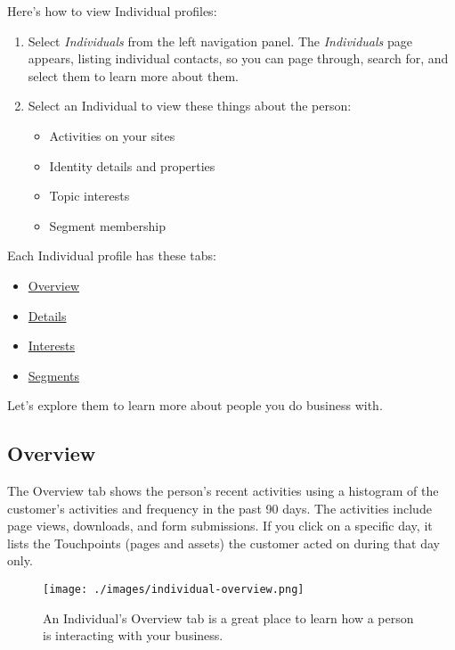 Here's how to view Individual profiles:

\begin{enumerate}
\def\labelenumi{\arabic{enumi}.}
\item
  Select \emph{Individuals} from the left navigation panel. The
  \emph{Individuals} page appears, listing individual contacts, so you
  can page through, search for, and select them to learn more about
  them.
\item
  Select an Individual to view these things about the person:

  \begin{itemize}
  \tightlist
  \item
    Activities on your sites
  \item
    Identity details and properties
  \item
    Topic interests
  \item
    Segment membership
  \end{itemize}
\end{enumerate}

Each Individual profile has these tabs:

\begin{itemize}
\tightlist
\item
  \hyperref[overview]{Overview}
\item
  \hyperref[details]{Details}
\item
  \hyperref[interests]{Interests}
\item
  \hyperref[segments]{Segments}
\end{itemize}

Let's explore them to learn more about people you do business with.

\subsection{Overview}\label{overview}

The Overview tab shows the person's recent activities using a histogram
of the customer's activities and frequency in the past 90 days. The
activities include page views, downloads, and form submissions. If you
click on a specific day, it lists the Touchpoints (pages and assets) the
customer acted on during that day only.

\begin{figure}
\centering
\texttt{[image: ./images/individual-overview.png]}
\caption{An Individual's Overview tab is a great place to learn how a
person is interacting with your business.}
\end{figure}

